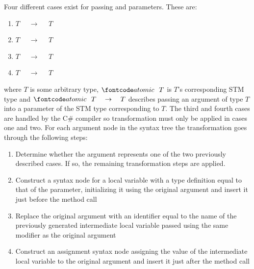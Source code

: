 Four different cases exist for passing  and  parameters. These are:
\begin{enumerate}
	\item $T$ $\quad \rightarrow \quad$  $T$
	\item {} $T$ $\quad \rightarrow\quad$ $T$
	\item {} $T$ $\quad \rightarrow\quad$  $T$
	\item $T$ $\quad \rightarrow \quad$ $T$
\end{enumerate} 
where $T$ is some arbitrary type, $\text{ } \bscode{atomic} \quad  T$ is $T$'s corresponding \ac{STM} type and $\text{ } \bscode{atomic} \quad T \quad \rightarrow \quad T$ describes passing an argument of type $T$ into a parameter of the \ac{STM} type corresponding to $T$. The third and fourth cases are handled by the C\# compiler so transformation must only be applied in cases one and two.
For each argument node in the syntax tree the transformation goes through the following steps:
\begin{enumerate}
	\item Determine whether the argument represents one of the two previously described cases. If so, the remaining transformation steps are applied.
	\item Construct a syntax node for a local variable with a type definition equal to that of the parameter, initializing it using the original argument and insert it just before the method call
	\item Replace the original argument with an identifier equal to the name of the previously generated intermediate local variable passed using the same modifier as the original argument
	\item Construct an assignment syntax node assigning the value of the intermediate local variable to the original argument and insert it just after the method call
\end{enumerate}


